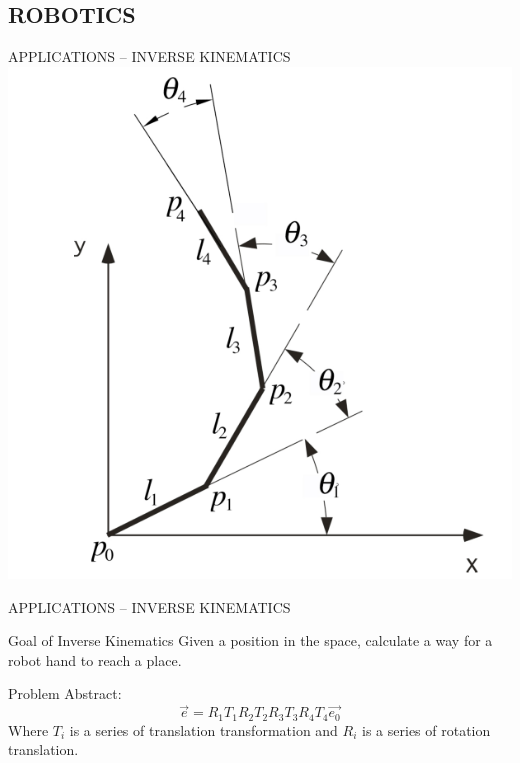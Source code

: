 \subsection{ROBOTICS}
\begin{frame}{ \LARGE APPLICATIONS -- INVERSE KINEMATICS}
\includegraphics[scale=0.6]{jcob.png}

\end{frame}

\begin{frame}{ \LARGE APPLICATIONS -- INVERSE KINEMATICS}
  \begin{blueblock}{Goal of Inverse Kinematics}
Given a position in the space, calculate a way for a robot hand to reach a place.

  \end{blueblock}
  \begin{redblock}{Problem Abstract:}
$$\vec{e} = R_1T_1R_2T_2R_3T_3R_4T_4\vec{e_0}$$
 Where $T_i$ is a series of translation transformation and $R_i$ is a
 series of rotation translation.

  \end{redblock}

\end{frame}

